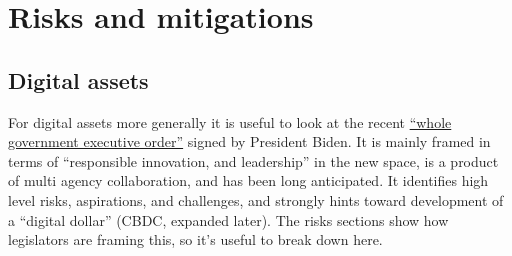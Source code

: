 \section{Risks and mitigations}
\subsection{Digital assets}
For digital assets more generally it is useful to look at the recent \href{https://www.whitehouse.gov/briefing-room/presidential-actions/2022/03/09/executive-order-on-ensuring-responsible-development-of-digital-assets/}{``whole government executive order''} signed by President Biden. It is mainly framed in terms of ``responsible innovation, and leadership'' in the new space, is a product of multi agency collaboration, and has been long anticipated. It identifies high level risks, aspirations, and challenges, and strongly hints toward development of a ``digital dollar'' (CBDC, expanded later). The risks sections show how legislators are framing this, so it's useful to break down here.\par
